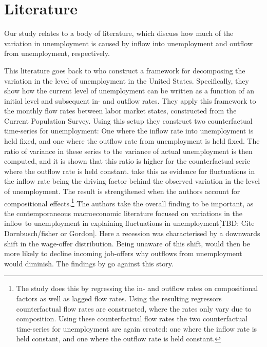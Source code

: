 \section{Literature}

Our study relates to a body of literature, which discuss how much of the variation in unemployment is caused by inflow into unemployment and outflow from unemployment, respectively. 

This literature goes back to \cite{Darby1986} who construct a framework for decomposing the variation in the level of unemployment in the United States. Specifically, they show how the current level of unemployment can be written as a function of an initial level and subsequent in- and outflow rates. They apply this framework to the monthly flow rates between labor market states, constructed from the Current Population Survey. Using this setup they construct two counterfactual time-series for unemployment: One where the inflow rate into unemployment is held fixed, and one where the outflow rate from unemployment is held fixed. The ratio of variance in these series to the variance of actual unemployment is then computed, and it is shown that this ratio is higher for the counterfactual serie where the outflow rate is held constant. \cite{Darby1986} take this as evidence for fluctuations in the inflow rate being the driving factor behind the observed variation in the level of unemployment. The result is strengthened when the authors account for compositional effects.\footnote{The study does this by regressing the in- and outflow rates on compositional factors as well as lagged flow  rates. Using the resulting regressors counterfactual flow rates are constructed, where the rates only vary due to composition. Using these counterfactual flow rates the two counterfactual time-series for unemployment are again created: one where the inflow rate is held constant, and one where the outflow rate is held constant.}  The authors take the overall finding to be important, as the contemporaneous macroeconomic literature focused on variations in the inflow to unemployment in explaining fluctuations in unemployment[TBD: Cite Dornbusch/fisher or Gordon]. Here a recession was characterised by a downwards shift in the wage-offer distribution. Being unaware of this shift, would then be more likely to decline incoming job-offers why outflows from unemployment would diminish. The findings by \cite{Darby1986} go against this story.

